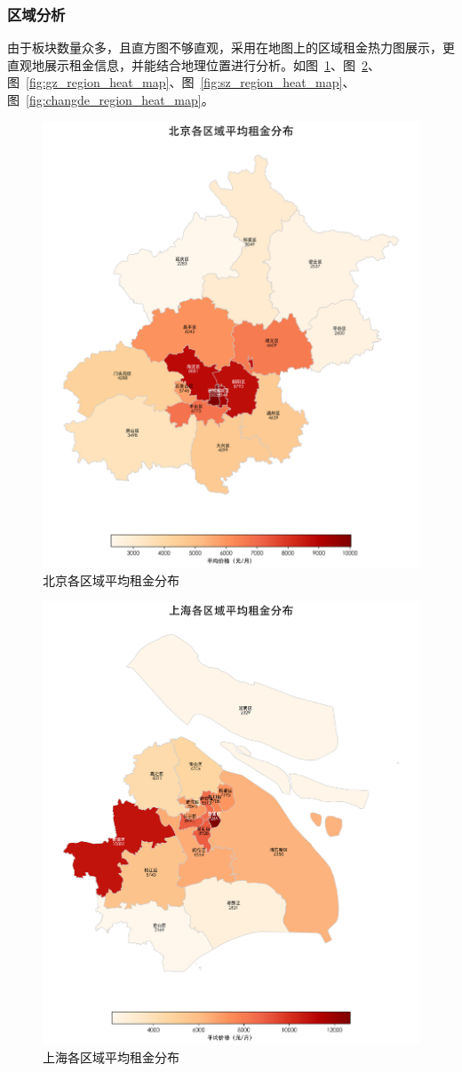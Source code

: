 \subsubsection{区域分析}
由于板块数量众多，且直方图不够直观，采用在地图上的区域租金热力图展示，更直观地展示租金信息，并能结合地理位置进行分析。如图~\ref{fig:bj_region_heat_map}、图~\ref{fig:sh_region_heat_map}、图~\ref{fig:gz_region_heat_map}、图~\ref{fig:sz_region_heat_map}、图~\ref{fig:changde_region_heat_map}。
\begin{figure}[htbp]
    \centering
    \includegraphics[width=0.7\linewidth]{../../figure/bj_region_heat_map.png}
    \caption{北京各区域平均租金分布}
    \label{fig:bj_region_heat_map}
\end{figure}
\begin{figure}[htbp]
    \centering
    \includegraphics[width=0.7\linewidth]{../../figure/sh_region_heat_map.png}
    \caption{上海各区域平均租金分布}
    \label{fig:sh_region_heat_map}
\end{figure}
